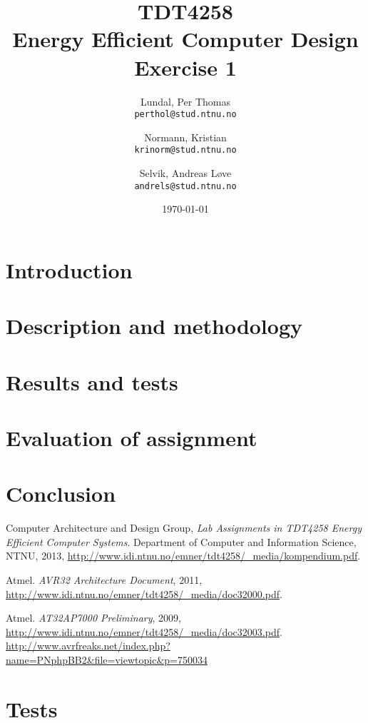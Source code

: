 \documentclass[a4paper,12pt]{article}
\title{TDT4258\\ Energy Efficient Computer Design
	\\Exercise 1}
\author{
    Lundal, Per Thomas\\
    \texttt{perthol@stud.ntnu.no}
    \and
    Normann, Kristian\\
    \texttt{krinorm@stud.ntnu.no}
    \and
    Selvik, Andreas Løve\\
    \texttt{andrels@stud.ntnu.no}
}
\date{\today}
\begin{document}
\maketitle

\clearpage
\begin{abstract}
    

\end{abstract}

\clearpage
\tableofcontents

\clearpage
\section{ Introduction}
    

\clearpage
\section{ Description and methodology}
    

\clearpage
\section{ Results and tests}
    

\clearpage
\section{ Evaluation of assignment}
    

\clearpage
\section{ Conclusion}
    

\clearpage

\begin{thebibliography}{9}

  Computer Architecture and Design Group,
  \emph{Lab Assignments in TDT4258 Energy Efficient
Computer Systems}.
  Department of Computer and Information Science, NTNU,
  2013,
  \url{http://www.idi.ntnu.no/emner/tdt4258/\_media/kompendium.pdf}.

  Atmel.
  \emph{AVR32 Architecture Document},
  2011,
  \url{http://www.idi.ntnu.no/emner/tdt4258/\_media/doc32000.pdf}.

  Atmel.
  \emph{AT32AP7000 Preliminary},
  2009,
  \url{http://www.idi.ntnu.no/emner/tdt4258/\_media/doc32003.pdf}.
  \url{http://www.avrfreaks.net/index.php?name=PNphpBB2&file=viewtopic&p=750034}

\end{thebibliography}
\clearpage

\appendix
{}
\section{Tests}

\end{document}
